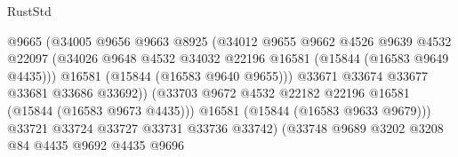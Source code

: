 \begin{lexlean}{RustStd}
\begin{coremodule}
                                          @9665
                                          (@34005
                                            @9656
                                            @9663
                                            @8925
                                            (@34012
                                              @9655
                                              @9662
                                              @4526
                                              @9639
                                              @4532
                                              @22097
                                              (@34026
                                                @9648
                                                @4532
                                                @34032
                                                @22196
                                                @16581
                                                (@15844 (@16583 @9649 @4435)))
                                              @16581
                                              (@15844 (@16583 @9640 @9655)))
                                            @33671
                                            @33674
                                            @33677
                                            @33681
                                            @33686
                                            @33692))
                                        (@33703
                                          @9672
                                          @4532
                                          @22182
                                          @22196
                                          @16581
                                          (@15844 (@16583 @9673 @4435)))
                                        @16581
                                        (@15844 (@16583 @9633 @9679)))
                                      @33721
                                      @33724
                                      @33727
                                      @33731
                                      @33736
                                      @33742)
                                    (@33748
                                      @9689
                                      @3202
                                      @3208
                                      @84
                                      @4435
                                      @9692
                                      @4435
                                      @9696

\end{coremodule}
\end{lexlean}
